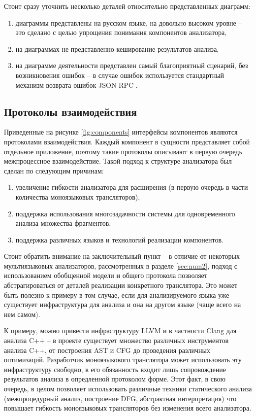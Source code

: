 Стоит сразу уточнить несколько деталей относительно представленных диаграмм:
\begin{enumerate}[1)]
    \item диаграммы представлены на русском языке, на довольно высоком уровне -- это сделано с целью упрощения
    понимания компонентов анализатора,
    \item на диаграммах не представленно кеширование результатов анализа,
    \item на диаграмме деятельности представлен самый благоприятный сценарий, без возникновения ошибок -- в случае ошибок
    используется стандартный механизм возврата ошибок JSON-RPC \cite{JSON-RPC}.
\end{enumerate}

\subsection{Протоколы взаимодействия}

Приведенные на рисунке \ref{fig:components} интерфейсы компонентов являются протоколами взаимодействия.
Каждый компонент в сущности представляет собой отдельное приложение, поэтому такие протоколы описывают в первую очередь межпроцессное взаимодействие.
Такой подход к структуре анализатора был сделан по следующим причинам:
\begin{enumerate}[1)]
    \item увеличение гибкости анализатора для расширения (в первую очередь в части количества моноязыковых трансляторов),
    \item поддержка использования многозадачности системы для одновременного анализа множества фрагментов,
    \item поддержка различных языков и технологий реализации компонентов.
\end{enumerate}

Стоит обратить внимание на заключительный пункт -- в отличие от некоторых мультиязыковых анализаторов, рассмотренных в разделе \ref{sec:num2},
подход с использованием обобщенной модели и общего протокола позволяет абстрагироваться от деталей реализации конкретного транслятора.
Это может быть полезно к примеру в том случае, если для анализируемого языка уже существует инфраструктура для анализа и она на другом языке
(чаще всего на нем самом). 

К примеру, можно привести инфраструктуру LLVM и в частности Clang для анализа C++ --
в проекте существует множество различных инструментов анализа C++, от построения AST и CFG до проведения различных оптимизаций.
Разработчик моноязыкового транслятора может использовать эту инфраструктуру свободно, в его обязанность входит лишь
сопровождение результатов анализа в опредленной протоколом форме.
Этот факт, в свою очередь, в целом позволяет использовать различные техники статического анализа (межпроцедурный анализ, построение DFG,
абстрактная интерпретация) что повышает гибкость моноязыковых трансляторов без изменения всего анализатора. 

